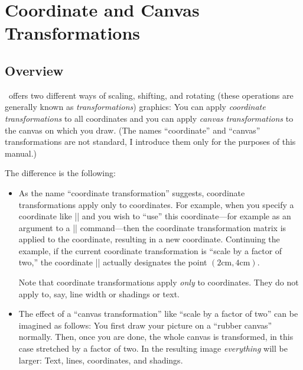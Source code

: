 %


\section{Coordinate and Canvas Transformations}

\subsection{Overview}

\pgfname\ offers two different ways of scaling, shifting, and rotating
(these operations are generally known as \emph{transformations})
graphics: You can apply \emph{coordinate transformations} to all
coordinates and you can apply \emph{canvas transformations} to the
canvas on which you draw. (The names ``coordinate'' and ``canvas''
transformations are not standard, I introduce them only for the
purposes of this manual.) 

The difference is the following:

\begin{itemize}
\item
  As the name ``coordinate transformation'' suggests, coordinate
  transformations apply only to coordinates. For example, when you
  specify a coordinate like |\pgfpoint{1cm}{2cm}| and you wish to
  ``use'' this coordinate---for example as an argument to a
  |\pgfpathmoveto| command---then the coordinate transformation matrix
  is applied to the coordinate, resulting in a new
  coordinate. Continuing the example, if the current coordinate
  transformation is ``scale by a factor of two,'' the coordinate
  |\pgfpoint{1cm}{2cm}| actually designates the point
  $(2\mathrm{cm},4\mathrm{cm})$. 

  Note that coordinate transformations apply \emph{only} to
  coordinates. They do not apply to, say, line width or shadings or
  text.
\item
  The effect of a ``canvas transformation'' like ``scale by a factor
  of two'' can be imagined as follows: You first draw your picture on
  a ``rubber canvas'' normally. Then, once you are done, the whole
  canvas is transformed, in this case stretched by a factor of
  two. In the resulting image \emph{everything} will be larger: Text,
  lines, coordinates, and shadings.
\end{itemize}

